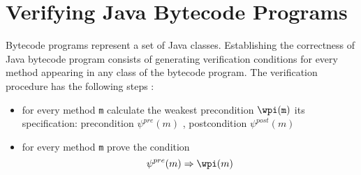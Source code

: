 \section{Verifying Java Bytecode Programs}\label{vcg}
Bytecode programs represent a set of Java classes. Establishing the correctness of Java bytecode program consists of generating verification conditions for every method appearing in any class of the bytecode program.
The verification procedure has the following steps :
\begin{itemize}
\item for every method \texttt{m} calculate the weakest precondition $\wpi(\tt{m})$ its specification:  precondition $\psi^{pre}(m)$ , postcondition $\psi^{post}(m)$
\item  for every method \texttt{m} prove the condition 
$$
\psi^{pre}(m)  \Rightarrow \wpi(m)
$$    
\end{itemize}



